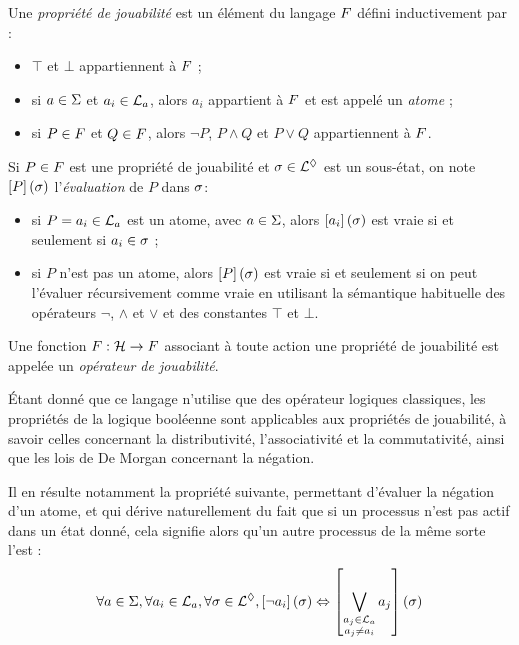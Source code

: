 \begin{definition}
  Une \emph{propriété de jouabilité} est un élément du langage $F$ défini inductivement par :
  \begin{itemize}
    \item $\top$ et $\bot$ appartiennent à $F$ ;
    \item si $a \in \Sigma$ et $a_i \in \mathcal{L}_a$, alors $a_i$ appartient à $F$
      et est appelé un \emph{atome} ;
    \item si $P \in F$ et $Q \in F$,
      alors $\neg P$, $P \wedge Q$ et $P \vee Q$ appartiennent à $F$.
  \end{itemize}
%
  Si $P \in F$ est une propriété de jouabilité et $\sigma \in \mathcal{L}^\lozenge$ est un sous-état,
  on note $\left[P\right](\sigma)$ l'\emph{évaluation} de $P$ dans $\sigma$:
  \begin{itemize}
    \item si $P = a_i \in \mathcal{L}_a$ est un atome, avec $a \in \Sigma$,
      alors $\left[a_i\right](\sigma)$ est vraie si et seulement si $a_i \in \sigma$ ;
    \item si $P$ n'est pas un atome, alors $\left[P\right](\sigma)$ est vraie si et seulement si
      on peut l'évaluer récursivement comme vraie en utilisant la sémantique habituelle des
      opérateurs $\neg$, $\wedge$ et $\vee$ et des constantes $\top$ et $\bot$.
  \end{itemize}
%
  Une fonction $F : \mathcal{H} \rightarrow F$ associant à toute action une propriété de jouabilité
  est appelée un \emph{opérateur de jouabilité}.
\end{definition}

Étant donné que ce langage n'utilise que des opérateur logiques classiques,
les propriétés de la logique booléenne sont applicables aux propriétés de jouabilité,
à savoir celles concernant la distributivité, l'associativité et la commutativité,
ainsi que les lois de De Morgan concernant la négation.

Il en résulte notamment la propriété suivante, permettant d'évaluer la négation d'un atome,
et qui dérive naturellement du fait que si un processus n'est pas actif dans un état donné,
cela signifie alors qu'un autre processus de la même sorte l'est :
\[\forall a \in \Sigma, \forall a_i \in \mathcal{L}_a, \forall \sigma \in \mathcal{L}^\lozenge,
  \left[\neg a_i\right](\sigma) \Leftrightarrow
  \left[\bigvee_{\substack{a_j \in \mathcal{L}_a\\a_j \neq a_i}} a_j\right](\sigma)\]

